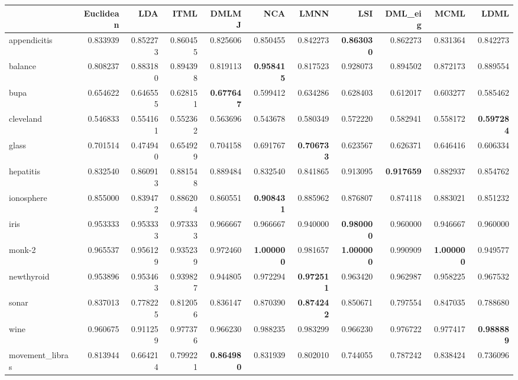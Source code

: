 \begin{tabular}{lrrrrrrrrrr}
\toprule
{} &  Euclidean &       LDA &      ITML &     DMLMJ &       NCA &      LMNN &       LSI &   DML\_eig &      MCML &      LDML \\
\midrule
appendicitis    &   0.833939 &  0.852273 &  0.860455 &  0.825606 &  0.850455 &  0.842273 &  \textbf{0.863030} &  0.862273 &  0.831364 &  0.842273 \\
balance         &   0.808237 &  0.883180 &  0.894398 &  0.819113 &  \textbf{0.958415} &  0.817523 &  0.928073 &  0.894502 &  0.872173 &  0.889554 \\
bupa            &   0.654622 &  0.646555 &  0.628151 &  \textbf{0.677647} &  0.599412 &  0.634286 &  0.628403 &  0.612017 &  0.603277 &  0.585462 \\
cleveland       &   0.546833 &  0.554161 &  0.552362 &  0.563696 &  0.543678 &  0.580349 &  0.572220 &  0.582941 &  0.558172 &  \textbf{0.597284} \\
glass           &   0.701514 &  0.474940 &  0.654929 &  0.704158 &  0.691767 &  \textbf{0.706733} &  0.623567 &  0.626371 &  0.646416 &  0.606334 \\
hepatitis       &   0.832540 &  0.860913 &  0.881548 &  0.889484 &  0.832540 &  0.841865 &  0.913095 &  \textbf{0.917659} &  0.882937 &  0.854762 \\
ionosphere      &   0.855000 &  0.839472 &  0.886204 &  0.860551 &  \textbf{0.908431} &  0.885962 &  0.876807 &  0.874118 &  0.883021 &  0.851232 \\
iris            &   0.953333 &  0.953333 &  0.973333 &  0.966667 &  0.966667 &  0.940000 &  \textbf{0.980000} &  0.960000 &  0.946667 &  0.960000 \\
monk-2          &   0.965537 &  0.956129 &  0.935239 &  0.972460 &  \textbf{1.000000} &  0.981657 &  \textbf{1.000000} &  0.990909 &  \textbf{1.000000} &  0.949577 \\
newthyroid      &   0.953896 &  0.953463 &  0.939827 &  0.944805 &  0.972294 &  \textbf{0.972511} &  0.963420 &  0.962987 &  0.958225 &  0.967532 \\
sonar           &   0.837013 &  0.778225 &  0.812056 &  0.836147 &  0.870390 &  \textbf{0.874242} &  0.850671 &  0.797554 &  0.847035 &  0.788680 \\
wine            &   0.960675 &  0.911259 &  0.977376 &  0.966230 &  0.988235 &  0.983299 &  0.966230 &  0.976722 &  0.977417 &  \textbf{0.988889} \\
movement\_libras &   0.813944 &  0.664214 &  0.799221 &  \textbf{0.864980} &  0.831939 &  0.802010 &  0.744055 &  0.787242 &  0.838424 &  0.736096 \\

\end{tabular}
